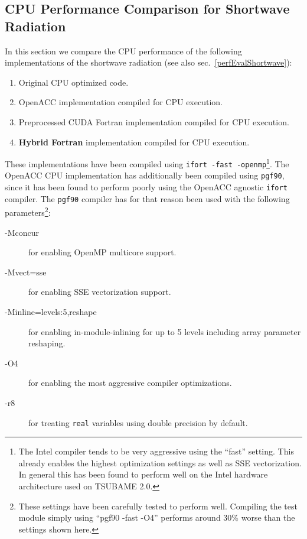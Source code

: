 \subsection{CPU Performance Comparison for Shortwave Radiation} \label{sub:performanceCPUValidation}
In this section we compare the CPU performance of the following implementations of the shortwave radiation (see also sec.~\ref{perfEvalShortwave}): 

\begin{enumerate}
 \item Original CPU optimized code.
 \item OpenACC implementation compiled for CPU execution.
 \item Preprocessed CUDA Fortran implementation compiled for CPU execution. 
 \item \textbf{Hybrid Fortran} implementation compiled for CPU execution. 
\end{enumerate}

These implementations have been compiled using \verb|ifort -fast -openmp|\footnote{The Intel compiler tends to be very aggressive using the ``fast'' setting. This already enables the highest optimization settings as well as SSE vectorization. In general this has been found to perform well on the Intel hardware architecture used on TSUBAME 2.0.}. The OpenACC CPU implementation has additionally been compiled using \verb|pgf90|, since it has been found to perform poorly using the OpenACC agnostic \verb|ifort| compiler. The \verb|pgf90| compiler has for that reason been used with the following parameters\footnote{These settings have been carefully tested to perform well. Compiling the test module simply using ``pgf90 -fast -O4'' performs around 30\% worse than the settings shown here.}:

\begin{description}
 \item [-Mconcur] for enabling OpenMP multicore support.
 \item [-Mvect=sse] for enabling SSE vectorization support.
 \item [-Minline=levels:5,reshape] for enabling in-module-inlining for up to 5 levels including array parameter reshaping.
 \item [-O4] for enabling the most aggressive compiler optimizations.
 \item [-r8] for treating \verb|real| variables using double precision by default.
\end{description}

